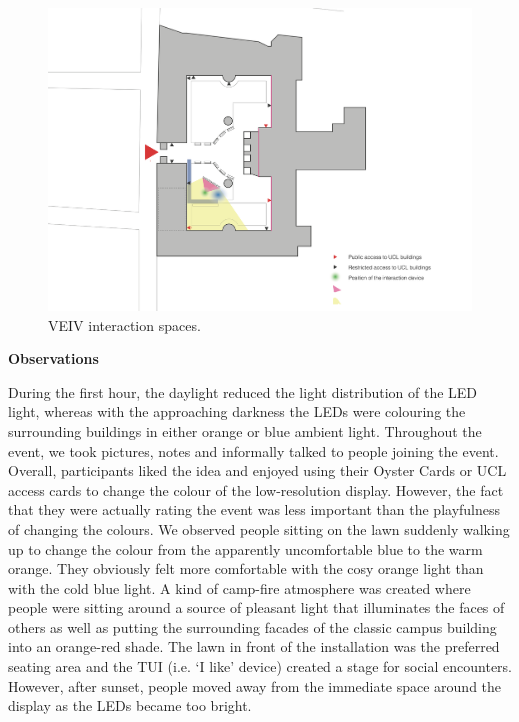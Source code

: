 \begin{figure}[!h] 
\centering
\includegraphics[width=\textwidth]{Illustrations/VIVEinteractionspaces.png}
\caption [VEIV interaction spaces] {VEIV interaction spaces.}
\label{VEIVinteractionspaces}
\end{figure}




\textbf{Observations}

During the first hour, the daylight reduced the light distribution of the LED light, whereas with the approaching darkness the LEDs were colouring the surrounding buildings in either orange or blue ambient light.
Throughout the event, we took pictures, notes and informally talked to people joining the event. Overall, participants liked the idea and enjoyed using their Oyster Cards or UCL access cards to change the colour of the low-resolution display. However, the fact that they were actually rating the event was less important than the playfulness of changing the colours.
We observed people sitting on the lawn suddenly walking up to change the colour from the apparently uncomfortable blue to the warm orange. They obviously felt more comfortable with the cosy orange light than with the cold blue light.
A kind of camp-fire atmosphere was created where people were sitting around a source of pleasant light that illuminates the faces of others as well as putting the surrounding facades of the classic campus building into an orange-red shade.
The lawn in front of the installation was the preferred seating area and the TUI (i.e. ‘I like’ device) created a stage for social encounters. However, after sunset, people moved away from the immediate space around the display as the LEDs became too bright. 

